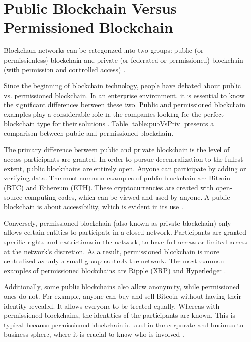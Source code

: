 \section{Public Blockchain Versus Permissioned Blockchain}\label{sec:versus}

Blockchain networks can be categorized into two groups: public (or permissionless) blockchain and private (or federated or permissioned) blockchain (with permission and controlled access) \cite{greve2018blockchain}.

Since the beginning of blockchain technology, people have debated about public vs. permissioned blockchain. In an enterprise environment, it is essential to know the significant differences between these two. Public and permissioned blockchain examples play a considerable role in the companies looking for the perfect blockchain type for their solutions \cite{101blockchains}. Table \ref{table:pubVsPriv} presents a comparison between public and permissioned blockchain.

The primary difference between public and private blockchain is the level of access participants are granted. In order to pursue decentralization to the fullest extent, public blockchains are entirely open. Anyone can participate by adding or verifying data. The most common examples of public blockchain are Bitcoin (BTC) and Ethereum (ETH). These cryptocurrencies are created with open-source computing codes, which can be viewed and used by anyone. A public blockchain is about accessibility, which is evident in its use \cite{selfkeyOrg}. 

Conversely, permissioned blockchain (also known as private blockchain) only allows certain entities to participate in a closed network. Participants are granted specific rights and restrictions in the network, to have full access or limited access at the network's discretion. As a result, permissioned blockchain is more centralized as only a small group controls the network. The most common examples of permissioned blockchains are Ripple (XRP) and Hyperledger \cite{blockgeeks2018deeper}.

Additionally, some public blockchains also allow anonymity, while permissioned ones do not. For example, anyone can buy and sell Bitcoin without having their identity revealed. It allows everyone to be treated equally. Whereas with permissioned blockchains, the identities of the participants are known. This is typical because permissioned blockchain is used in the corporate and business-to-business sphere, where it is crucial to know who is involved \cite{101blockchains}.

